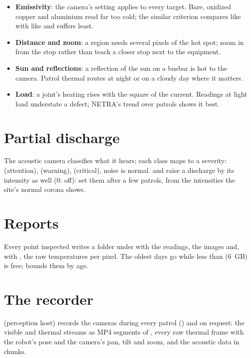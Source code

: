 \begin{itemize}
  \item \textbf{Emissivity}: the camera's setting applies to every target. Bare, oxidized copper and
    aluminium read far too cold; the similar criterion compares like with like and suffers least.
  \item \textbf{Distance and zoom}: a region needs several pixels of the hot spot; zoom in from the
    stop rather than teach a closer stop next to the equipment.
  \item \textbf{Sun and reflections}: a reflection of the sun on a busbar is hot to the camera. Patrol
    thermal routes at night or on a cloudy day where it matters.
  \item \textbf{Load}: a joint's heating rises with the square of the current. Readings at light
    load understate a defect; NETRA's trend over patrols shows it best.
\end{itemize}

\section{Partial discharge}

The acoustic camera classifies what it hears; each class maps to a severity:
 (attention),  (warning), 
(critical), noise is normal.  and  raise a
discharge by its intensity as well (0: off): set them after a few patrols, from the intensities
the site's normal corona shows.

\section{Reports}

Every point inspected writes a folder under  with the readings, the images and,
with , the raw temperatures per pixel. The oldest days go while less
than  (\SI{6}{GB}) is free;  bounds them by age.

\section{The recorder}

 (perception host) records the cameras during every patrol () and on
request: the visible and thermal streams as MP4 segments of , every raw
thermal frame with the robot's pose and the camera's pan, tilt and zoom, and the acoustic data in
chunks.

